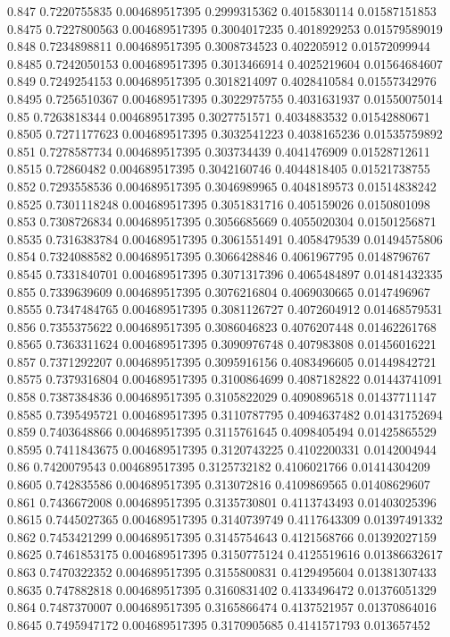 {0.847 0.7220755835 0.004689517395 0.2999315362 0.4015830114 0.01587151853
0.8475 0.7227800563 0.004689517395 0.3004017235 0.4018929253 0.01579589019
0.848 0.7234898811 0.004689517395 0.3008734523 0.402205912 0.01572099944
0.8485 0.7242050153 0.004689517395 0.3013466914 0.4025219604 0.01564684607
0.849 0.7249254153 0.004689517395 0.3018214097 0.4028410584 0.01557342976
0.8495 0.7256510367 0.004689517395 0.3022975755 0.4031631937 0.01550075014
0.85 0.7263818344 0.004689517395 0.3027751571 0.4034883532 0.01542880671
0.8505 0.7271177623 0.004689517395 0.3032541223 0.4038165236 0.01535759892
0.851 0.7278587734 0.004689517395 0.303734439 0.4041476909 0.01528712611
0.8515 0.72860482 0.004689517395 0.3042160746 0.4044818405 0.01521738755
0.852 0.7293558536 0.004689517395 0.3046989965 0.4048189573 0.01514838242
0.8525 0.7301118248 0.004689517395 0.3051831716 0.405159026 0.0150801098
0.853 0.7308726834 0.004689517395 0.3056685669 0.4055020304 0.01501256871
0.8535 0.7316383784 0.004689517395 0.3061551491 0.4058479539 0.01494575806
0.854 0.7324088582 0.004689517395 0.3066428846 0.4061967795 0.0148796767
0.8545 0.7331840701 0.004689517395 0.3071317396 0.4065484897 0.01481432335
0.855 0.7339639609 0.004689517395 0.3076216804 0.4069030665 0.0147496967
0.8555 0.7347484765 0.004689517395 0.3081126727 0.4072604912 0.01468579531
0.856 0.7355375622 0.004689517395 0.3086046823 0.4076207448 0.01462261768
0.8565 0.7363311624 0.004689517395 0.3090976748 0.407983808 0.01456016221
0.857 0.7371292207 0.004689517395 0.3095916156 0.4083496605 0.01449842721
0.8575 0.7379316804 0.004689517395 0.3100864699 0.4087182822 0.01443741091
0.858 0.7387384836 0.004689517395 0.3105822029 0.4090896518 0.01437711147
0.8585 0.7395495721 0.004689517395 0.3110787795 0.4094637482 0.01431752694
0.859 0.7403648866 0.004689517395 0.3115761645 0.4098405494 0.01425865529
0.8595 0.7411843675 0.004689517395 0.3120743225 0.4102200331 0.0142004944
0.86 0.7420079543 0.004689517395 0.3125732182 0.4106021766 0.01414304209
0.8605 0.742835586 0.004689517395 0.313072816 0.4109869565 0.01408629607
0.861 0.7436672008 0.004689517395 0.3135730801 0.4113743493 0.01403025396
0.8615 0.7445027365 0.004689517395 0.3140739749 0.4117643309 0.01397491332
0.862 0.7453421299 0.004689517395 0.3145754643 0.4121568766 0.01392027159
0.8625 0.7461853175 0.004689517395 0.3150775124 0.4125519616 0.01386632617
0.863 0.7470322352 0.004689517395 0.3155800831 0.4129495604 0.01381307433
0.8635 0.747882818 0.004689517395 0.3160831402 0.4133496472 0.01376051329
0.864 0.7487370007 0.004689517395 0.3165866474 0.4137521957 0.01370864016
0.8645 0.7495947172 0.004689517395 0.3170905685 0.4141571793 0.013657452
}
